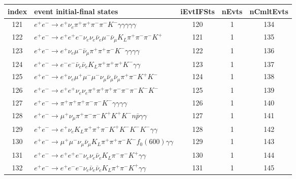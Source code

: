 \documentclass[landscape]{article}
\begin{document}
\clearpage

\begin{table}[htbp!]
\small
\centering
\begin{tabular}{|c|>{\centering}p{18cm}|c|c|c|}
\hline
index & event initial-final states & iEvtIFSts & nEvts & nCmltEvts \\
\hline
121 & $ e^{+} e^{-} \rightarrow e^{+} \nu_{e} \pi^{+} \pi^{+} \pi^{-} \pi^{-} K^{-} \gamma \gamma \gamma \gamma \gamma $ & 120 & 1 & 134 \\
\hline
122 & $ e^{+} e^{-} \rightarrow e^{+} e^{+} e^{-} \nu_{e} \nu_{e} \bar{\nu}_{e} \mu^{-} \bar{\nu}_{\mu} K_{L} \pi^{+} \pi^{-} \pi^{-} K^{+} $ & 121 & 1 & 135 \\
\hline
123 & $ e^{+} e^{-} \rightarrow e^{+} \nu_{e} \mu^{-} \bar{\nu}_{\mu} \pi^{+} \pi^{+} \pi^{-} K^{-} \gamma \gamma \gamma \gamma $ & 122 & 1 & 136 \\
\hline
124 & $ e^{+} e^{-} \rightarrow e^{-} e^{-} \bar{\nu}_{e} \bar{\nu}_{e} K_{L} \pi^{+} \pi^{+} \pi^{+} K^{-} \gamma \gamma $ & 123 & 1 & 137 \\
\hline
125 & $ e^{+} e^{-} \rightarrow e^{+} \nu_{e} \mu^{+} \mu^{-} \mu^{-} \nu_{\mu} \bar{\nu}_{\mu} \bar{\nu}_{\mu} \pi^{+} \pi^{-} K^{+} K^{-} $ & 124 & 1 & 138 \\
\hline
126 & $ e^{+} e^{-} \rightarrow e^{+} e^{+} \nu_{e} \nu_{e} \pi^{+} \pi^{+} \pi^{+} \pi^{-} \pi^{-} \pi^{-} K^{-} K^{-} $ & 125 & 1 & 139 \\
\hline
127 & $ e^{+} e^{-} \rightarrow \pi^{+} \pi^{+} \pi^{+} \pi^{-} \pi^{-} K^{-} \gamma \gamma \gamma \gamma $ & 126 & 1 & 140 \\
\hline
128 & $ e^{+} e^{-} \rightarrow \mu^{+} \nu_{\mu} \pi^{+} \pi^{-} \pi^{-} K^{+} K^{+} K^{-} n \bar{p} \gamma \gamma $ & 127 & 1 & 141 \\
\hline
129 & $ e^{+} e^{-} \rightarrow e^{+} \nu_{e} K_{L} \pi^{+} \pi^{+} \pi^{-} K^{+} K^{-} K^{-} K^{-} \gamma \gamma $ & 128 & 1 & 142 \\
\hline
130 & $ e^{+} e^{-} \rightarrow \mu^{+} \mu^{-} \nu_{\mu} \bar{\nu}_{\mu} K_{L} \pi^{+} \pi^{+} \pi^{-} K^{-} f_{0}(600) \gamma \gamma $ & 129 & 1 & 143 \\
\hline
131 & $ e^{+} e^{-} \rightarrow e^{+} e^{+} e^{-} \nu_{e} \nu_{e} \bar{\nu}_{e} K_{L} \pi^{-} \pi^{-} K^{+} \gamma \gamma $ & 130 & 1 & 144 \\
\hline
132 & $ e^{+} e^{-} \rightarrow e^{+} e^{-} e^{-} \nu_{e} \bar{\nu}_{e} \bar{\nu}_{e} K_{L} \pi^{+} \pi^{-} K^{+} \gamma \gamma $ & 131 & 1 & 145 \\

\end{tabular}
\end{table}
\end{document}
